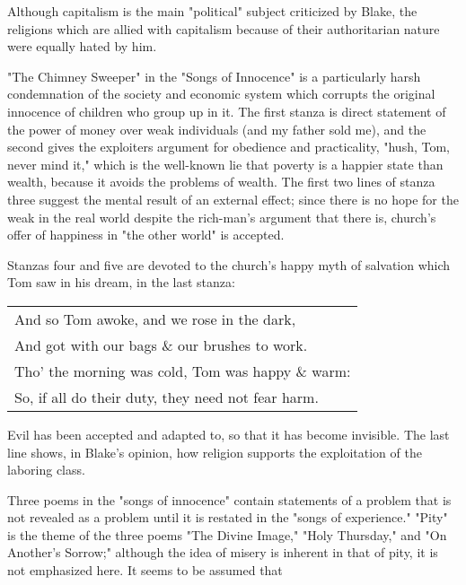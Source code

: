 \noindent  Although capitalism is the main "political" subject criticized by Blake,
the religions which are allied with capitalism because of their authoritarian nature were equally hated by him.\par
\vspace*{0.5\baselineskip}
"The Chimney Sweeper" in the "Songs of Innocence" is a particularly harsh condemnation of the society and economic system
which corrupts the original innocence of children who group up in it. The first stanza is direct statement of the power of money
over weak individuals (and my father sold me), and the second gives the exploiters argument for obedience and practicality, "hush, Tom, never mind it," which
is the well-known lie that poverty is a happier state than wealth, because it avoids the problems of wealth. The first two lines
of stanza three suggest the mental result of an external effect; since there is no hope for the weak in the real world despite the rich-man's argument
that there is, church's offer of happiness in "the other world" is accepted.\par
\vspace*{0.5\baselineskip}
Stanzas four and five are devoted to the church's happy myth of salvation which Tom saw in his dream, in the last stanza:\par
\begin{center}
	\parbox{0.8\textwidth}{
		\centering
		\begin{tabular}{l}
			And so Tom awoke, and we rose in the dark,        \\
			And got with our bags \& our brushes to work.     \\
			Tho' the morning was cold, Tom was happy \& warm: \\
			So, if all do their duty, they need not fear harm.
		\end{tabular}
	}%
\end{center}
Evil has been accepted and adapted to, so that it has become invisible. The last line shows, in Blake's opinion, how 
religion supports the exploitation of the laboring class.\par
\vspace*{0.5\baselineskip}
Three poems in the "songs of innocence" contain statements of a problem that is not revealed as a problem until
it is restated in the "songs of experience." "Pity" is the theme of the three poems "The Divine Image," "Holy Thursday," and
"On Another's Sorrow;" although the idea of misery is inherent in that of pity, it is not emphasized here. It seems to be assumed that
